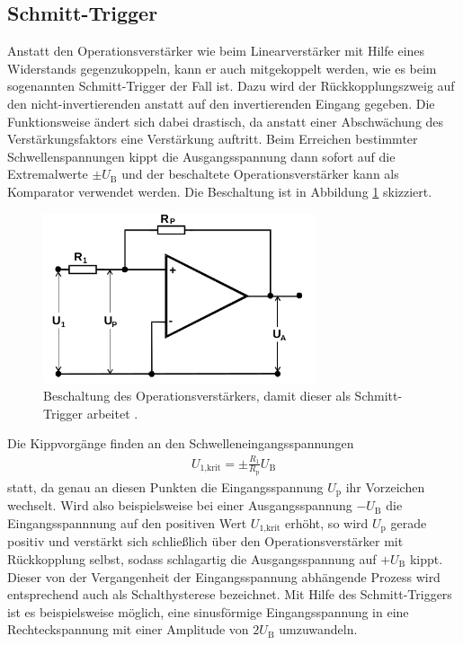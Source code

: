 \subsection{Schmitt-Trigger}

Anstatt den Operationsverstärker wie beim Linearverstärker mit Hilfe eines Widerstands gegenzukoppeln, kann
er auch mitgekoppelt werden, wie es beim sogenannten Schmitt-Trigger der Fall ist. Dazu wird der Rückkopplungszweig
auf den nicht-invertierenden anstatt auf den invertierenden Eingang
gegeben. Die Funktionsweise ändert sich dabei drastisch, da anstatt einer Abschwächung des Verstärkungsfaktors
eine Verstärkung auftritt. Beim Erreichen bestimmter Schwellenspannungen kippt die Ausgangsspannung dann sofort auf
die Extremalwerte $\pm U_\text{B}$ und der beschaltete Operationsverstärker kann als Komparator verwendet werden.
Die Beschaltung ist in Abbildung \ref{fig:schmitttrigger} skizziert.

\begin{figure}
  \centering
  \includegraphics[height=5cm]{ImmerDieseNorweger/schmitttrigger.png}
  \caption{Beschaltung des Operationsverstärkers, damit dieser als Schmitt-Trigger arbeitet \cite{anleitung}.}
  \label{fig:schmitttrigger}
\end{figure}

Die Kippvorgänge finden an den Schwelleneingangsspannungen
\begin{align}
  U_\text{1,krit} = \pm \frac{R_1}{R_\text{p}} U_\text{B}
\end{align}
statt, da genau an diesen Punkten die Eingangsspannung $U_\text{p}$ ihr Vorzeichen
wechselt. Wird also beispielsweise bei einer Ausgangsspannung $-U_\text{B}$ die Eingangsspannnung
auf den positiven Wert $U_\text{1,krit}$ erhöht, so wird $U_\text{p}$ gerade positiv
und verstärkt sich schließlich über den Operationsverstärker mit Rückkopplung selbst,
sodass schlagartig die Ausgangsspannung auf $+U_\text{B}$ kippt. Dieser von der
Vergangenheit der Eingangsspannung abhängende Prozess wird entsprechend auch als Schalthysterese
bezeichnet. Mit Hilfe des Schmitt-Triggers ist es beispielsweise möglich, eine sinusförmige
Eingangsspannung in eine Rechteckspannung mit einer Amplitude von $2 U_\text{B}$ umzuwandeln.


